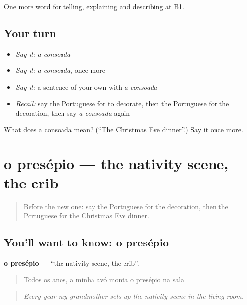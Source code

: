 \begin{grammarlens}[title={What you've built}]
One more word for telling, explaining and describing at B1.
\end{grammarlens}

\subsection*{Your turn}
\begin{itemize}
\raggedright
  \item \emph{Say it:} \emph{a consoada}
  \item \emph{Say it:} \emph{a consoada}, once more
  \item \emph{Say it:} a sentence of your own with \emph{a consoada}
  \item \emph{Recall:} say the Portuguese for to decorate, then the Portuguese for the decoration, then say \emph{a consoada} again
\end{itemize}

\begin{tcolorbox}[breakable,colback=teal!4,colframe=teal!35!black,title={Before you move on}]
What does a consoada mean? (\textquotedblleft{}The Christmas Eve dinner\textquotedblright{}.) Say it once more.
\end{tcolorbox}
\section[o presépio]{o presépio — the nativity scene, the crib}

\label{lesson:PT-C323-presepio}



\begin{quote}
Before the new one: say the Portuguese for the decoration, then the Portuguese for the Christmas Eve dinner.
\end{quote}

\subsection*{You'll want to know: o presépio}
\textbf{o presépio} — \textquotedblleft{}the nativity scene, the crib\textquotedblright{}.

\begin{quote}
Todos os anos, a minha avó monta o presépio na sala.
\end{quote}

\begin{quote}
\emph{Every year my grandmother sets up the nativity scene in the living room.}
\end{quote}

